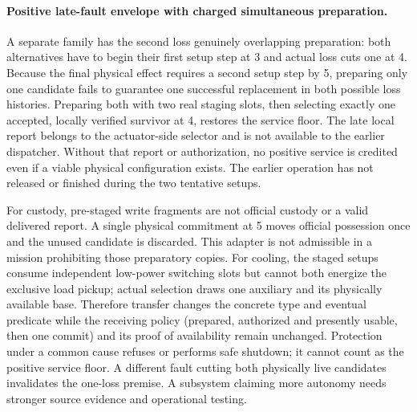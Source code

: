 \documentclass{article}
\begin{document}
\paragraph{Positive late-fault envelope with charged simultaneous preparation.}
A separate family has the second loss genuinely overlapping preparation: both alternatives have to begin their first setup step at 3 and actual loss cuts one at 4. Because the final physical effect requires a second setup step by 5, preparing only one candidate fails to guarantee one successful replacement in both possible loss histories. Preparing both with two real staging slots, then selecting exactly one accepted, locally verified survivor at 4, restores the service floor. The late local report belongs to the actuator-side selector and is not available to the earlier dispatcher. Without that report or authorization, no positive service is credited even if a viable physical configuration exists. The earlier operation has not released or finished during the two tentative setups.

For custody, pre-staged write fragments are not official custody or a valid delivered report. A single physical commitment at 5 moves official possession once and the unused candidate is discarded. This adapter is not admissible in a mission prohibiting those preparatory copies. For cooling, the staged setups consume independent low-power switching slots but cannot both energize the exclusive load pickup; actual selection draws one auxiliary and its physically available base. Therefore transfer changes the concrete type and eventual predicate while the receiving policy (prepared, authorized and presently usable, then one commit) and its proof of availability remain unchanged. Protection under a common cause refuses or performs safe shutdown; it cannot count as the positive service floor. A different fault cutting both physically live candidates invalidates the one-loss premise. A subsystem claiming more autonomy needs stronger source evidence and operational testing.
\end{document}
